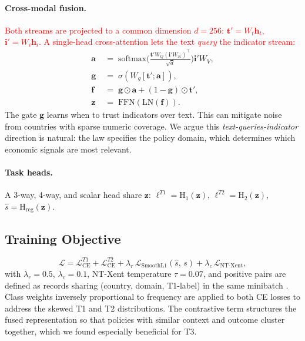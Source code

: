 \documentclass[11pt]{article}
\begin{document}
\paragraph{Cross-modal fusion.}
\textcolor{red}{Both streams are projected to a common dimension $d=256$: $\mathbf{t}'\!=\!W_t\mathbf{h}_t$, $\mathbf{i}'\!=\!W_i\mathbf{h}_i$. A single-head cross-attention
lets the text \emph{query} the indicator stream:}
\begin{align}
\mathbf{a}\;&=\;\text{softmax}\!\Big(\tfrac{\mathbf{t}'W_Q(\mathbf{i}'W_K)^{\!\top}}{\sqrt{d}}\Big)\mathbf{i}'W_V,\\
\mathbf{g}\;&=\;\sigma(W_g[\mathbf{t}';\mathbf{a}]),\\
\mathbf{f}\;&=\;\mathbf{g}\odot\mathbf{a}+(1-\mathbf{g})\odot\mathbf{t}',\\
\mathbf{z}\;&=\;\text{FFN}(\text{LN}(\mathbf{f})).
\end{align}
The gate $\mathbf{g}$ learns when to trust indicators over text. This can mitigate noise from countries with sparse numeric coverage. We argue this \emph{text-queries-indicator} direction is natural: the law specifies the policy domain, which determines which economic signals are most relevant.

\paragraph{Task heads.}
A 3-way, 4-way, and scalar head share $\mathbf{z}$:
$\ell^{T1}\!=\!\text{H}_{1}(\mathbf{z})$,
$\ell^{T2}\!=\!\text{H}_{2}(\mathbf{z})$,
$\hat{s}\!=\!\text{H}_{\text{reg}}(\mathbf{z})$.

\subsection{Training Objective}

\begin{equation}
\mathcal{L} = \mathcal{L}_{\text{CE}}^{T1} + \mathcal{L}_{\text{CE}}^{T2}
            + \lambda_r\,\mathcal{L}_{\text{SmoothL1}}(\hat{s},\,s)
            + \lambda_c\,\mathcal{L}_{\text{NT-Xent}},
\label{eq:loss}
\end{equation}
with $\lambda_r\!=\!0.5$, $\lambda_c\!=\!0.1$, NT-Xent temperature
$\tau\!=\!0.07$, and positive pairs are defined as records sharing (country, domain, T1-label) in the same minibatch \citep{chen2020simclr}. Class weights inversely proportional to frequency are applied to both CE losses to address the skewed T1 and T2 distributions. The contrastive term structures the fused
representation so that policies with similar context and outcome cluster together, which we found especially beneficial for T3.
\end{document}
